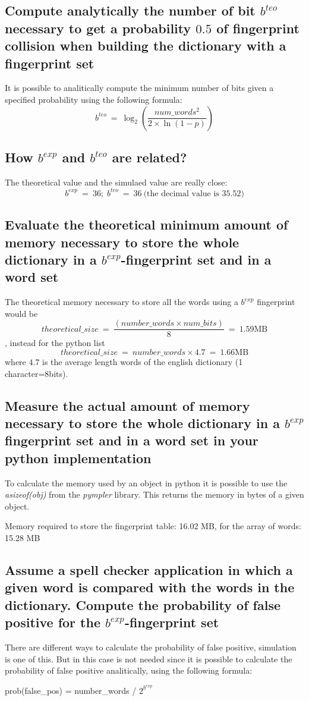 \documentclass{report}
\begin{document}
{			\subsection{Compute analytically the number of bit $b^{teo}$ necessary to get a probability $0.5$ of fingerprint collision when building the dictionary with a fingerprint set}
					It is possible to analitically compute the minimum number of bits given a specified probability using the following formula:
					\[
						b^{teo} \: = \: \log_2{ \left( \frac{num\_words^2}{2\times \ln\left({1-p}\right)} \right)}
					\]
			\subsection{How $b^{exp}$ and $b^{teo}$ are related?}
					The theoretical value and the simulaed value are really close: 
					\[
							b^{exp} \: = \: 36; \; 	b^{teo} \: = \: 36 \: \text{(the decimal value is 35.52)}
					\]
			
			\subsection{Evaluate the theoretical minimum amount of memory necessary to store the whole dictionary in a $b^{exp}$-fingerprint set and in a word set}
			The theoretical memory necessary to store all the words using a $b^{exp}$ fingerprint would be \[ theoretical\_size \: = \: \frac{(number\_words \times num\_bits)}{8} \: = \: 1.59 \text{MB}\], instead for the python list \[ theoretical\_size \: = \: number\_words \times 4.7 \: = \: 1.66 \text{MB}\] where $4.7$ is the average length words of the english dictionary (1 character=8bits).
						
			\subsection{Measure the actual amount of memory necessary to store the whole dictionary in a $b^{exp}$ fingerprint set and in a word set in your python implementation}
			To calculate the memory used by an object in python it is possible to use the \emph{asizeof(obj)} from the \emph{pympler} library. This returns the memory in bytes of a given object.
			\begin{center}
					Memory required to store the fingerprint table: 16.02 MB, for the array of words: 15.28 MB
			\end{center}
			
			\subsection{Assume a spell checker application in which a given word is compared with the words in the dictionary. Compute the probability of false positive for the $b^{exp}$-fingerprint set}
			There are different ways to calculate the probability of false positive, simulation is one of this. But in this case is not needed since it is possible to calculate the probability of false positive analitically, using the following formula:
			\begin{center}
					prob(false\_pos) = number\_words / $2^{b^{exp}}$
			\end{center}
			
}
\end{document}
